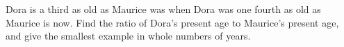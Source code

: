 Dora is a third as old as Maurice was when Dora was one fourth as old as Maurice is now. Find the ratio of Dora's present age to Maurice's present age, and give the smallest example in whole numbers of years.
